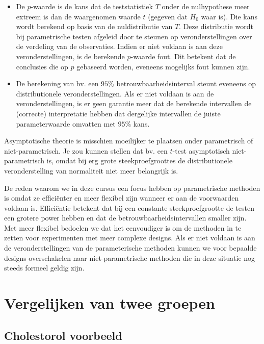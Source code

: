 \documentclass[
  dutch,
  letterpaper,
  12pt]{book}
\theoremstyle{definition}
\theoremstyle{definition}
\theoremstyle{definition}
\theoremstyle{remark}
\begin{document}
\begin{itemize}
\item
  De \(p\)-waarde is de kans dat de teststatistiek \(T\) onder de
  nulhypothese meer extreem is dan de waargenomen waarde \(t\) (gegeven
  dat \(H_0\) waar is). Die kans wordt berekend op basis van de
  nuldistributie van \(T\). Deze distributie wordt bij parametrische
  testen afgeleid door te steunen op veronderstellingen over de
  verdeling van de observaties. Indien er niet voldaan is aan deze
  veronderstellingen, is de berekende \(p\)-waarde fout. Dit betekent
  dat de conclusies die op \(p\) gebaseerd worden, eveneens mogelijks
  fout kunnen zijn.
\item
  De berekening van bv. een \(95\%\) betrouwbaarheidsinterval steunt
  eveneens op distributionele veronderstellingen. Als er niet voldaan is
  aan de veronderstellingen, is er geen garantie meer dat de berekende
  intervallen de (correcte) interpretatie hebben dat dergelijke
  intervallen de juiste parameterwaarde omvatten met \(95\%\) kans.
\end{itemize}

Asymptotische theorie is misschien moeilijker te plaatsen onder
parametrisch of niet-parametrisch. Je zou kunnen stellen dat bv. een
\(t\)-test asymptotisch niet-parametrisch is, omdat bij erg grote
steekproefgroottes de distributionele veronderstelling van normaliteit
niet meer belangrijk is.

De reden waarom we in deze cursus een focus hebben op parametrische
methoden is omdat ze efficiënter en meer flexibel zijn wanneer er aan de
voorwaarden voldaan is. Efficiëntie betekent dat bij een constante
steekproefgrootte de testen een grotere power hebben en dat de
betrouwbaarheidsintervallen smaller zijn. Met meer flexibel bedoelen we
dat het eenvoudiger is om de methoden in te zetten voor experimenten met
meer complexe designs. Als er niet voldaan is aan de veronderstellingen
van de parameterische methoden kunnen we voor bepaalde designs
overschakelen naar niet-parametrische methoden die in deze situatie nog
steeds formeel geldig zijn.

\section{Vergelijken van twee
groepen}\label{vergelijken-van-twee-groepen}

\subsection{Cholestorol voorbeeld}\label{cholestorol-voorbeeld}
\end{document}
